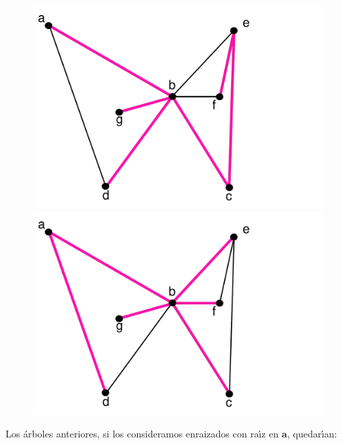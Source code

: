 \documentclass[ebook,oneside]{memoir}
\newcommand{\bolds}[1]{\boldsymbol{#1}}
\begin{document}
      \begin{center}
           \begin{figure}[h!]\centering
           \includegraphics[scale=0.2]{BEP.pdf}
           \includegraphics[scale=0.2]{BEA.pdf}
           \end{figure}
      \end{center}

\vspace{0.2cm}
Los \'{a}rboles anteriores, si los consideramos enraizados con ra\'{\i}z en $\bolds{a}$, quedar\'{\i}an:
\end{document}
